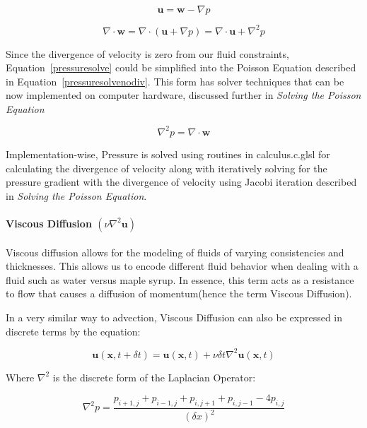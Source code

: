 \documentclass[conference]{IEEEtran}
\begin{document}
\begin{equation}
	\mathbf{u}=\mathbf{w}-\nabla p
\label{pressuregrad}
\end{equation}


\begin{equation}
	\nabla \cdot \mathbf{w}=\nabla \cdot(\mathbf{u}+\nabla p)=\nabla \cdot \mathbf{u}+\nabla^{2} p
	\label{pressuresolve}
\end{equation}

Since the divergence of velocity is zero from our fluid constraints, Equation~\eqref{pressuresolve} could be simplified into the Poisson Equation described in Equation~\eqref{pressuresolvenodiv}. This form has solver techniques that can be now implemented on computer hardware, discussed further in \textit{Solving the Poisson Equation}

\begin{equation}
\nabla^{2} p=\nabla \cdot \mathbf{w}
\label{pressuresolvenodiv}
\end{equation}


Implementation-wise, Pressure is solved using routines in calculus.c.glsl for calculating the divergence of velocity along with iteratively solving for the pressure gradient with the divergence of velocity using Jacobi iteration described in \textit{Solving the Poisson Equation}.


\paragraph{Viscous Diffusion $(\nu \nabla^{2} \mathbf{u})$} Viscous diffusion allows for the modeling of fluids of varying consistencies and thicknesses. This allows us to encode different fluid behavior when dealing with a fluid such as water versus maple syrup. In essence, this term acts as a resistance to flow that causes a diffusion of momentum(hence the term Viscous Diffusion). 

In a very similar way to advection, Viscous Diffusion can also be expressed in discrete terms by the equation:

\begin{equation}
	\label{diffunstable}
\mathbf{u}(\mathbf{x}, t+\delta t)=\mathbf{u}(\mathbf{x}, t)+\nu \delta t \nabla^{2} \mathbf{u}(\mathbf{x}, t)
\end{equation}

Where $\nabla^2$ is the discrete form of the Laplacian Operator:

\begin{equation}
\nabla^{2} p=\frac{p_{i+1, j}+p_{i-1, j}+p_{i, j+1}+p_{i, j-1}-4 p_{i, j}}{(\delta x)^{2}}
\end{equation}
\end{document}
